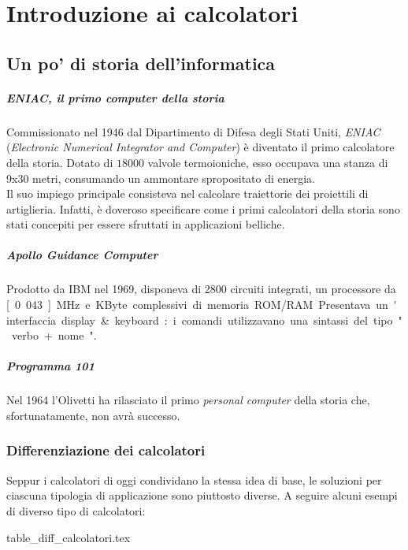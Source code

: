 \documentclass[class=book, crop=false]{standalone}
\begin{document}
\chapter{Introduzione ai calcolatori}
\section{Un po' di storia dell'informatica}
\paragraph{ENIAC, il primo computer della storia}
Commissionato nel 1946 dal Dipartimento di Difesa degli Stati Uniti, \emph{ENIAC} (\emph{Electronic Numerical Integrator and Computer}) è diventato il primo calcolatore della storia.
Dotato di $18000$ valvole termoioniche, esso occupava una stanza di 9x30 metri, consumando un ammontare spropositato di energia.\\
Il suo impiego principale consisteva nel calcolare traiettorie dei proiettili di artiglieria. Infatti, è doveroso specificare come i primi calcolatori della storia sono stati concepiti per essere sfruttati in applicazioni belliche.

\paragraph{Apollo Guidance Computer}
Prodotto da IBM nel 1969, disponeva di 2800 circuiti integrati, un processore da \unit[0.043]{MHz} e \unit[152]{KByte} complessivi di memoria ROM/RAM. Presentava un'interfaccia display \& keyboard: i comandi utilizzavano una sintassi del tipo "verbo + nome".

\paragraph{Programma 101} Nel 1964 l'Olivetti ha rilasciato il primo \emph{personal computer} della storia che, sfortunatamente, non avrà successo.

\subsection{Differenziazione dei calcolatori}
Seppur i calcolatori di oggi condividano la stessa idea di base, le soluzioni per ciascuna tipologia di applicazione sono piuttosto diverse. A seguire alcuni esempi di diverso tipo di calcolatori:

\begin{table}[H]
  \centering
  {table_diff_calcolatori.tex}
\end{table}
\end{document}
